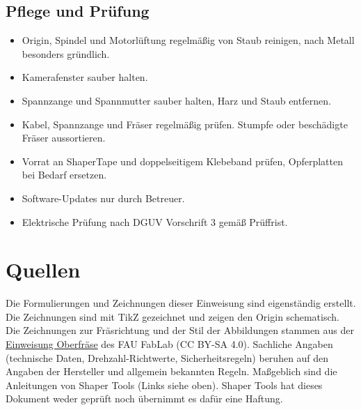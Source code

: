 \documentclass{\basedir/fablab-document}
\begin{document}
	\subsection{Pflege und Prüfung}
	\begin{itemize}
		\item Origin, Spindel und Motorlüftung regelmäßig von Staub reinigen, nach Metall besonders gründlich.
		\item Kamerafenster sauber halten.
		\item Spannzange und Spannmutter sauber halten, Harz und Staub entfernen.
		\item Kabel, Spannzange und Fräser regelmäßig prüfen. Stumpfe oder beschädigte Fräser aussortieren.
		\item Vorrat an ShaperTape und doppelseitigem Klebeband prüfen, Opferplatten bei Bedarf ersetzen.
		\item Software-Updates nur durch Betreuer.
		\item Elektrische Prüfung nach DGUV Vorschrift 3 gemäß Prüffrist.
	\end{itemize}

	\section{Quellen}
	Die Formulierungen und Zeichnungen dieser Einweisung sind eigenständig erstellt. Die Zeichnungen sind mit TikZ gezeichnet und zeigen den Origin schematisch. Die Zeichnungen zur Fräsrichtung und der Stil der Abbildungen stammen aus der \href{https://github.com/fau-fablab/festool-oberfraese-einweisung}{Einweisung Oberfräse} des FAU FabLab (CC BY-SA 4.0). Sachliche Angaben (technische Daten, Drehzahl-Richtwerte, Sicherheitsregeln) beruhen auf den Angaben der Hersteller und allgemein bekannten Regeln. Maßgeblich sind die Anleitungen von Shaper Tools (Links siehe oben). Shaper Tools hat dieses Dokument weder geprüft noch übernimmt es dafür eine Haftung.

\end{document}
